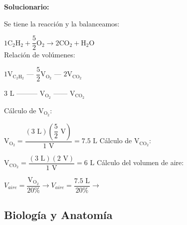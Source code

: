 \begin{enumerate}[resume]
	\vspace{2mm}
	\textbf{Solucionario:}

	Se tiene la reacción y la balanceamos:

	$ 1\text{C}_2\text{H}_2 + \dfrac{5}{2}\text{O}_2 \rightarrow 2\text{CO}_2 + \text{H}_2\text{O} $\\

	Relación de volúmenes:

	$ 1\text{V}_{\text{C}_2\text{H}_2} \text{ --- } \dfrac{5}{2}\text{V}_{\text{O}_2} \text{ --- } 2\text{V}_{\text{CO}_2} $

	$ 3\text{ L} \text{ --------- } \text{V}_{\text{O}_2} \text{ ------ } \text{V}_{\text{CO}_2} $

	Cálculo de $\text{V}_{\text{O}_2}$:

	$ \text{V}_{\text{O}_2} = \dfrac{(3\text{ L})(\dfrac{5}{2}\text{ V})}{1\text{ V}} = 7.5\text{ L} $
	Cálculo de $\text{V}_{\text{CO}_2}$:

	$ \text{V}_{\text{CO}_2} = \dfrac{(3\text{ L})(2\text{ V})}{1\text{ V}} = 6\text{ L} $
	Cálculo del volumen de aire:

	$ V_{aire} = \dfrac{\text{V}_{\text{O}_2}}{20\%} \rightarrow V_{aire} = \dfrac{7.5\text{ L}}{20\%} \rightarrow$  

	\vspace{6mm}

\end{enumerate}






\subsection*{Biología y Anatomía}

